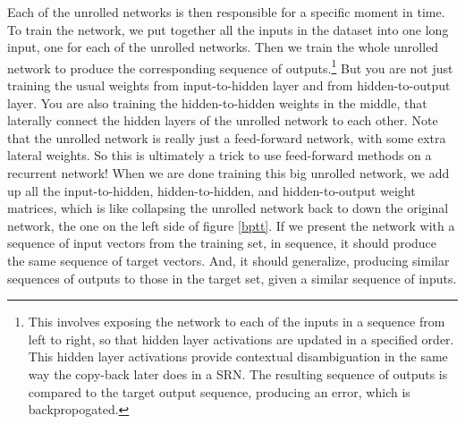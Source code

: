 Each of the unrolled networks is then responsible for a specific moment in time. To train the network, we put together all the inputs in the dataset into one long input, one for each of the unrolled networks. Then we train the whole unrolled network to produce the corresponding sequence of outputs.\footnote{This involves exposing the network to each of the inputs in a sequence from left to right, so that hidden layer activations are updated in a specified order. This hidden layer activations provide contextual disambiguation in the same way the copy-back later does in a SRN. The resulting sequence of outputs is compared to the target output sequence, producing an error, which is backpropogated.} But you are not just training the usual weights from input-to-hidden layer and from hidden-to-output layer. You are also training the hidden-to-hidden weights in the middle, that laterally connect the hidden layers  of the unrolled network to each other. Note that the unrolled network is really just a feed-forward network, with some extra lateral weights. So this is ultimately a trick to use feed-forward methods on a recurrent network! When we are done training this big unrolled network, we add up all the input-to-hidden, hidden-to-hidden, and hidden-to-output weight matrices, which is like collapsing the unrolled network back to down the original network, the one on the left side of figure \ref{bptt}. If we present the network with a sequence of input vectors from the training set, in sequence, it should produce the same sequence of target vectors. And, it should generalize, producing similar sequences of outputs to those in the target set, given a similar sequence of inputs. 


